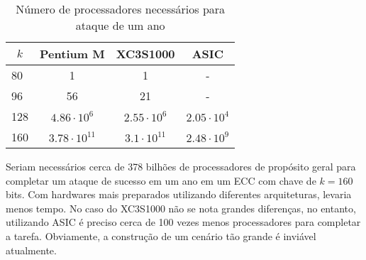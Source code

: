 \begin{table}[]
\centering
\caption{Número de processadores necessários para ataque de um ano}
\label{table:required_chips}
\begin{tabular}{|l|c|c|c|}
\hline
\multicolumn{1}{|c|}{\(k\)} & \textbf{Pentium M}   & \textbf{XC3S1000}   & \textbf{ASIC}     \\ \hline
80                      & 1                    & 1                   & -                 \\ \hline
96                      & 56                   & 21                  & -                 \\ \hline
128                     & $4.86 \cdot 10^6$    & $2.55 \cdot 10^6$   & $2.05 \cdot 10^4$ \\ \hline
160                     & $3.78 \cdot 10^{11}$ & $3.1 \cdot 10^{11}$ & $2.48 \cdot 10^9$ \\ \hline
\end{tabular}
\end{table}

Seriam necessários cerca de 378 bilhões de processadores de propósito geral para completar um ataque de sucesso em um ano em um ECC com chave de \(k = 160\) bits. Com hardwares mais preparados utilizando diferentes arquiteturas, levaria menos tempo. No caso do XC3S1000 não se nota grandes diferenças, no entanto, utilizando ASIC é preciso cerca de 100 vezes menos processadores para completar a tarefa. Obviamente, a construção de um cenário tão grande é inviável atualmente.

